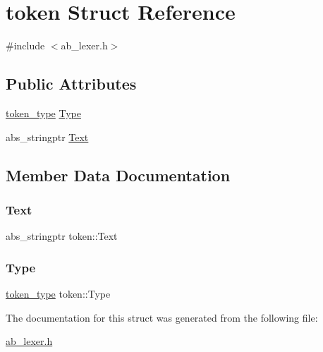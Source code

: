 \hypertarget{structtoken}{}\section{token Struct Reference}
\label{structtoken}


{\ttfamily \#include $<$ab\+\_\+lexer.\+h$>$}

\subsection*{Public Attributes}
\begin{DoxyCompactItemize}
\item 
\hyperlink{ab__lexer_8h_afe5ef662303b6b710ea6ee1a944bad0d}{token\+\_\+type} \hyperlink{structtoken_a82914c351900753f626fa2d6fcb12fde}{Type}
\item 
abs\+\_\+stringptr \hyperlink{structtoken_afe96285022144ed40a345ac60d688550}{Text}
\end{DoxyCompactItemize}


\subsection{Member Data Documentation}
\mbox{\label{structtoken_afe96285022144ed40a345ac60d688550}} 
\subsubsection{\texorpdfstring{Text}{Text}}
{\footnotesize\ttfamily abs\+\_\+stringptr token\+::\+Text}

\mbox{\label{structtoken_a82914c351900753f626fa2d6fcb12fde}} 
\subsubsection{\texorpdfstring{Type}{Type}}
{\footnotesize\ttfamily \hyperlink{ab__lexer_8h_afe5ef662303b6b710ea6ee1a944bad0d}{token\+\_\+type} token\+::\+Type}



The documentation for this struct was generated from the following file\+:\begin{DoxyCompactItemize}
\item 
\hyperlink{ab__lexer_8h}{ab\+\_\+lexer.\+h}\end{DoxyCompactItemize}
